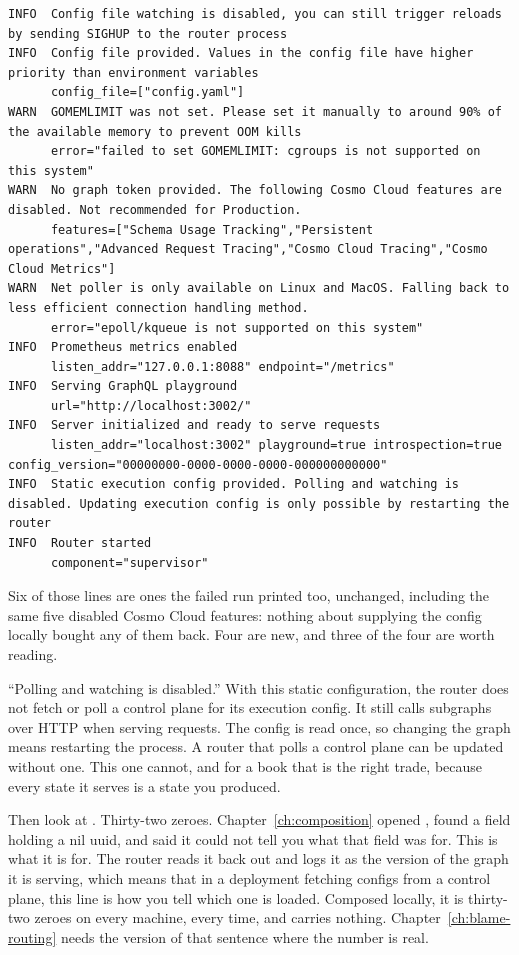\begin{verbatim}
INFO  Config file watching is disabled, you can still trigger reloads by sending SIGHUP to the router process
INFO  Config file provided. Values in the config file have higher priority than environment variables
      config_file=["config.yaml"]
WARN  GOMEMLIMIT was not set. Please set it manually to around 90% of the available memory to prevent OOM kills
      error="failed to set GOMEMLIMIT: cgroups is not supported on this system"
WARN  No graph token provided. The following Cosmo Cloud features are disabled. Not recommended for Production.
      features=["Schema Usage Tracking","Persistent operations","Advanced Request Tracing","Cosmo Cloud Tracing","Cosmo Cloud Metrics"]
WARN  Net poller is only available on Linux and MacOS. Falling back to less efficient connection handling method.
      error="epoll/kqueue is not supported on this system"
INFO  Prometheus metrics enabled
      listen_addr="127.0.0.1:8088" endpoint="/metrics"
INFO  Serving GraphQL playground
      url="http://localhost:3002/"
INFO  Server initialized and ready to serve requests
      listen_addr="localhost:3002" playground=true introspection=true config_version="00000000-0000-0000-0000-000000000000"
INFO  Static execution config provided. Polling and watching is disabled. Updating execution config is only possible by restarting the router
INFO  Router started
      component="supervisor"
\end{verbatim}

%
Six of those lines are ones the failed run printed too, unchanged, including
the same five disabled Cosmo Cloud features: nothing about supplying the config
locally bought any of them back. Four are new, and three of the four are worth
reading.

%
\enquote{Polling and watching is disabled.} With this static configuration,
the router does not fetch or poll a control plane for its execution config.
It still calls subgraphs over HTTP when serving requests. The config is read
once, so changing the graph means restarting the process. A router that polls a
control plane can be updated without one. This one cannot, and for a book that
is the right trade, because every state it serves is a state you produced.

%
Then look at . Thirty-two zeroes.
Chapter~\ref{ch:composition} opened , found a 
field holding a nil uuid, and said it could not tell you what that field was
for. This is what it is for. The router reads it back out and logs it as the
version of the graph it is serving, which means that in a deployment fetching
configs from a control plane, this line is how you tell which one is loaded.
Composed locally, it is thirty-two zeroes on every machine, every time, and
carries nothing. Chapter~\ref{ch:blame-routing} needs the version of that
sentence where the number is real.

